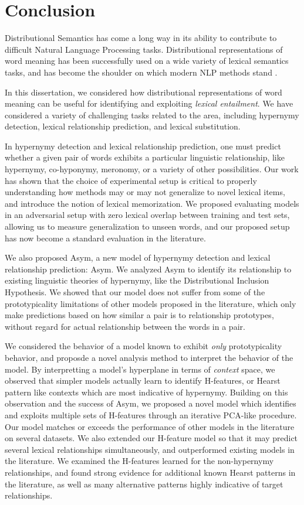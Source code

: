 \chapter{Conclusion}
\label{ch:conclusion}

Distributional Semantics has come a long way in its ability to contribute
to difficult Natural Language Processing tasks. Distributional representations
of word meaning has been successfully used on a wide variety of lexical semantics
tasks, and has become the shoulder on which modern NLP methods stand
\cite{goldberg:2016:jair}.

In this dissertation, we considered how distributional representations of word
meaning can be useful for identifying and exploiting {\em lexical entailment}.
We have considered a variety of challenging tasks related to the area,
including hypernymy detection, lexical relationship prediction, and lexical
substitution.

In hypernymy detection and lexical relationship prediction, one must predict
whether a given pair of words exhibits a particular linguistic relationship,
like hypernymy, co-hyponymy, meronomy, or a variety of other possibilities.
Our work has shown that the choice of experimental setup is critical to properly
understanding how methods may or may not generalize to novel lexical items,
and introduce the notion of lexical memorization. We proposed evaluating models
in an adversarial setup with zero lexical overlap between training and test
sets, allowing us to measure generalization to unseen words, and our proposed
setup has now become a standard evaluation in the literature.

We also proposed Asym, a new model of hypernymy detection and
lexical relationship prediction: Asym. We analyzed Asym to identify
its relationship to existing linguistic theories of hypernymy, like the
Distributional Inclusion Hypothesis. We showed that our model does not suffer
from some of the prototypicality limitations of other models proposed in the
literature, which only make predictions based on how similar a pair is to
relationship prototypes, without regard for actual relationship between the
words in a pair.

We considered the behavior of a model known to exhibit {\em only}
prototypicality behavior, and proposde a novel analysis method to interpret the
behavior of the model. By interpretting a model's hyperplane in terms of {\em
context} space, we observed that simpler models actually
learn to identify H-features, or Hearst pattern like contexts which are most
indicative of hypernymy. Building on this observation and the success of
Asym, we proposed a novel model which identifies and exploits multiple sets of
H-features through an iterative PCA-like procedure. Our model matches or
exceeds the performance of other models in the literature on several datasets.
We also extended our H-feature model so that it may predict several lexical
relationships simultaneously, and outperformed existing models in the literature.
We examined the H-features learned for the non-hypernymy relationships, and
found strong evidence for additional known Hearst patterns in the literature,
as well as many alternative patterns highly indicative of target relationships.

